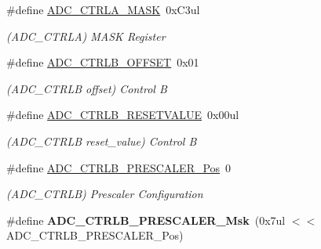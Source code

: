 \begin{DoxyCompactItemize}
\item 
\hypertarget{group___s_a_m_l21___a_d_c_ga27d2475024ff104bf51f4575cdbbe276}{}\#define \hyperlink{group___s_a_m_l21___a_d_c_ga27d2475024ff104bf51f4575cdbbe276}{A\+D\+C\+\_\+\+C\+T\+R\+L\+A\+\_\+\+M\+A\+S\+K}~0x\+C3ul\label{group___s_a_m_l21___a_d_c_ga27d2475024ff104bf51f4575cdbbe276}

\begin{DoxyCompactList}\small\item\em (A\+D\+C\+\_\+\+C\+T\+R\+L\+A) M\+A\+S\+K Register \end{DoxyCompactList}\item 
\hypertarget{group___s_a_m_l21___a_d_c_gaa53e5615c9d9951bc7efb464caf48d1f}{}\#define \hyperlink{group___s_a_m_l21___a_d_c_gaa53e5615c9d9951bc7efb464caf48d1f}{A\+D\+C\+\_\+\+C\+T\+R\+L\+B\+\_\+\+O\+F\+F\+S\+E\+T}~0x01\label{group___s_a_m_l21___a_d_c_gaa53e5615c9d9951bc7efb464caf48d1f}

\begin{DoxyCompactList}\small\item\em (A\+D\+C\+\_\+\+C\+T\+R\+L\+B offset) Control B \end{DoxyCompactList}\item 
\hypertarget{group___s_a_m_l21___a_d_c_ga05bc133f816637a15b503b70679f6798}{}\#define \hyperlink{group___s_a_m_l21___a_d_c_ga05bc133f816637a15b503b70679f6798}{A\+D\+C\+\_\+\+C\+T\+R\+L\+B\+\_\+\+R\+E\+S\+E\+T\+V\+A\+L\+U\+E}~0x00ul\label{group___s_a_m_l21___a_d_c_ga05bc133f816637a15b503b70679f6798}

\begin{DoxyCompactList}\small\item\em (A\+D\+C\+\_\+\+C\+T\+R\+L\+B reset\+\_\+value) Control B \end{DoxyCompactList}\item 
\hypertarget{group___s_a_m_l21___a_d_c_ga67bbef18402c0d73dcc1698fa185ab76}{}\#define \hyperlink{group___s_a_m_l21___a_d_c_ga67bbef18402c0d73dcc1698fa185ab76}{A\+D\+C\+\_\+\+C\+T\+R\+L\+B\+\_\+\+P\+R\+E\+S\+C\+A\+L\+E\+R\+\_\+\+Pos}~0\label{group___s_a_m_l21___a_d_c_ga67bbef18402c0d73dcc1698fa185ab76}

\begin{DoxyCompactList}\small\item\em (A\+D\+C\+\_\+\+C\+T\+R\+L\+B) Prescaler Configuration \end{DoxyCompactList}\item 
\hypertarget{group___s_a_m_l21___a_d_c_ga4b9e8131975ab900605823a3b0341258}{}\#define {\bfseries A\+D\+C\+\_\+\+C\+T\+R\+L\+B\+\_\+\+P\+R\+E\+S\+C\+A\+L\+E\+R\+\_\+\+Msk}~(0x7ul $<$$<$ A\+D\+C\+\_\+\+C\+T\+R\+L\+B\+\_\+\+P\+R\+E\+S\+C\+A\+L\+E\+R\+\_\+\+Pos)\label{group___s_a_m_l21___a_d_c_ga4b9e8131975ab900605823a3b0341258}


\end{DoxyCompactItemize}
